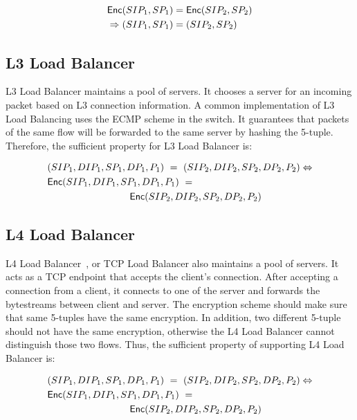 \begin{equation}
\label{eqn:nat2}
\begin{split}
& \mathsf{Enc}(SIP_1, SP_1) = \mathsf{Enc}(SIP_2, SP_2) \\
& \Rightarrow (SIP_1, SP_1) = (SIP_2, SP_2) 
\end{split}
\end{equation}

\subsection{L3 Load Balancer}
L3 Load Balancer maintains a pool of servers. It chooses a server for an incoming packet based on
L3 connection information. A common implementation of L3 Load Balancing uses the ECMP scheme in the 
switch. It guarantees that packets of the same flow will be forwarded to the same server by hashing
the 5-tuple. Therefore, the sufficient property for L3 Load Balancer is:

\begin{equation}
\label{eqn:l3lb}
\begin{split}
& (SIP_1, DIP_1, SP_1, DP_1, P_1)\ =\ (SIP_2, DIP_2, SP_2, DP_2, P_2) \Leftrightarrow \\
& \Enc(SIP_1, DIP_1, SP_1, DP_1, P_1)\ =\\
& \hspace{3cm} \Enc(SIP_2, DIP_2, SP_2, DP_2, P_2)
\end{split}
\end{equation}



\subsection{L4 Load Balancer}
L4 Load Balancer~\cite{haproxy}, or TCP Load Balancer also maintains a pool of servers.
It acts as a TCP endpoint that accepts the client's connection. After accepting a connection from a client,
it connects to one of the server and forwards the bytestreams between client and server. The encryption
scheme should make sure that same 5-tuples have the same encryption. In addition, two different 5-tuple
should not have the same encryption, otherwise the L4 Load Balancer cannot distinguish those two flows.
Thus, the sufficient property of supporting L4 Load Balancer is:

\begin{equation}
\label{eqn:l4lb}
\begin{split}
& (SIP_1, DIP_1, SP_1, DP_1, P_1)\ =\ (SIP_2, DIP_2, SP_2, DP_2, P_2) \Leftrightarrow \\
& \Enc(SIP_1, DIP_1, SP_1, DP_1, P_1)\ = \\
& \hspace{3cm}\Enc(SIP_2, DIP_2, SP_2, DP_2, P_2)
\end{split}
\end{equation}

